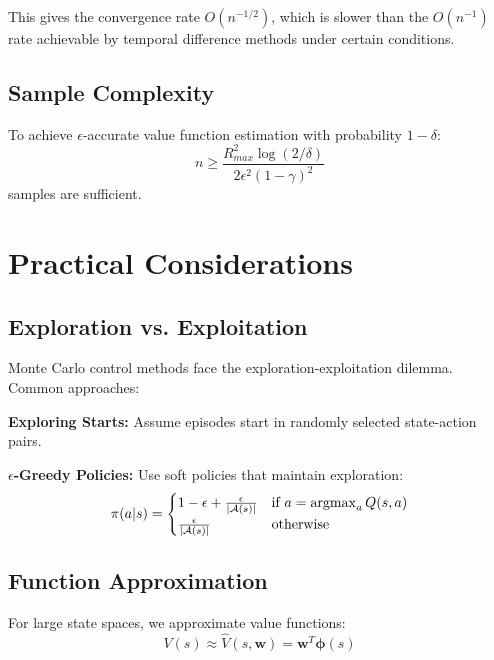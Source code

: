 This gives the convergence rate $O(n^{-1/2})$, which is slower than the $O(n^{-1})$ rate achievable by temporal difference methods under certain conditions.

\subsection{Sample Complexity}

\begin{theorem}
To achieve $\epsilon$-accurate value function estimation with probability $1-\delta$:
\begin{equation}
n \geq \frac{R_{max}^2 \log(2/\delta)}{2\epsilon^2(1-\gamma)^2}
\end{equation}
samples are sufficient.
\end{theorem}

\section{Practical Considerations}

\subsection{Exploration vs. Exploitation}

Monte Carlo control methods face the exploration-exploitation dilemma. Common approaches:

\textbf{Exploring Starts:} Assume episodes start in randomly selected state-action pairs.

\textbf{$\epsilon$-Greedy Policies:} Use soft policies that maintain exploration:
\begin{equation}
\pi(a|s) = \begin{cases}
1 - \epsilon + \frac{\epsilon}{|\mathcal{A}(s)|} & \text{if } a = \operatorname*{argmax}_a Q(s,a) \\
\frac{\epsilon}{|\mathcal{A}(s)|} & \text{otherwise}
\end{cases}
\end{equation}

\subsection{Function Approximation}

For large state spaces, we approximate value functions:
\begin{equation}
V(s) \approx \hat{V}(s, \mathbf{w}) = \mathbf{w}^T \boldsymbol{\phi}(s)
\end{equation}

